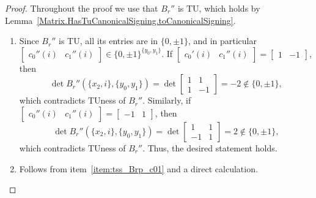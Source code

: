 \begin{proof}
    \leanok
    Throughout the proof we use that $B_{r}''$ is TU, which holds by Lemma~\ref{Matrix.HasTuCanonicalSigning.toCanonicalSigning}.

    \begin{enumerate}
        \item Since $B_{r}''$ is TU, all its entries are in $\{0, \pm 1\}$, and in particular $\begin{bmatrix} c_{0}'' (i) & c_{1}'' (i) \end{bmatrix} \in \{0, \pm 1\}^{\{y_{0}, y_{1}\}}$. If $\begin{bmatrix} c_{0}' (i) & c_{1}'' (i) \end{bmatrix} = \begin{bmatrix} 1 & -1 \end{bmatrix}$, then
        \[
            \det B_{r}'' (\{x_{2}, i\}, \{y_{0}, y_{1}\}) = \det \begin{bmatrix} 1 & 1 \\ 1 & -1 \end{bmatrix} = -2 \notin \{0, \pm 1\},
        \]
        which contradicts TUness of $B_{r}''$. Similarly, if $\begin{bmatrix} c_{0}'' (i) & c_{1}'' (i) \end{bmatrix} = \begin{bmatrix} -1 & 1 \end{bmatrix} $, then
        \[
            \det B_{r}'' (\{x_{2}, i\}, \{y_{0}, y_{1}\}) = \det \begin{bmatrix} 1 & 1 \\ -1 & 1 \end{bmatrix} = 2 \notin \{0, \pm 1\},
        \]
        which contradicts TUness of $B_{r}''$. Thus, the desired statement holds.

        \item Follows from item~\ref{item:tss_Brp_c01} and a direct calculation.


\end{enumerate}
\end{proof}
